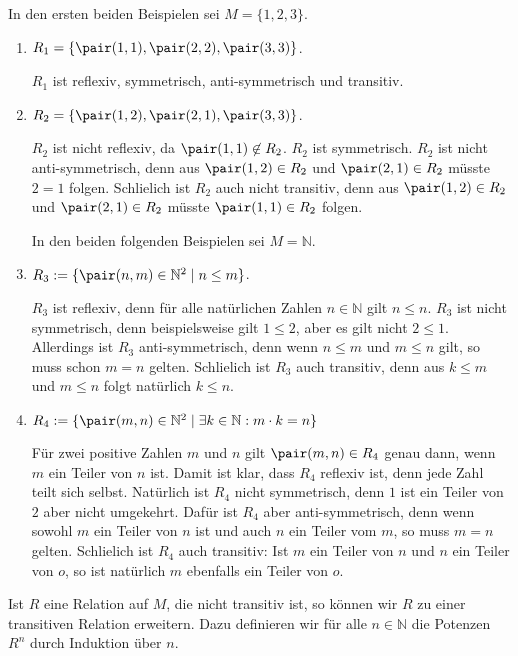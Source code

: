 \examples
In den ersten beiden Beispielen sei $M = \{1,2,3\}$.
\begin{enumerate}
\item $R_1 = \{ \pair(1,1), \pair(2,2), \pair(3,3) \}$.

      $R_1$ ist reflexiv, symmetrisch, anti-symmetrisch und transitiv.
\item $R_2 = \{ \pair(1,2), \pair(2,1), \pair(3,3) \}$.

      $R_2$ ist nicht reflexiv, da $\pair(1,1) \not\in R_2$.
      $R_2$ ist symmetrisch. 
      $R_2$ ist nicht anti-symmetrisch, denn aus $\pair(1,2) \in R_2$ und 
      $\pair(2,1) \in R_2$ m\"{u}sste $2=1$ folgen.
      Schlie\3lich ist $R_2$ auch nicht transitiv, denn aus $\pair(1,2) \in R_2$ und 
      $\pair(2,1) \in R_2$ m\"{u}sste $\pair(1,1) \in R_2$ folgen.

      In den beiden folgenden Beispielen sei $M = \mathbb{N}$.
\item $R_3 := \{ \pair(n,m) \in \mathbb{N}^2 \mid n \leq m \}$.

      $R_3$ ist reflexiv, denn f\"{u}r alle nat\"{u}rlichen Zahlen $n \in \mathbb{N}$ gilt 
      $n \leq n$.  $R_3$ ist nicht symmetrisch, denn beispielsweise gilt
      $1 \leq 2$, aber es gilt nicht $2 \leq 1$.  Allerdings ist $R_3$ anti-symmetrisch,
      denn wenn $n \leq m$  und $m \leq n$ gilt, so muss schon $m = n$ gelten.
      Schlie\3lich ist $R_3$ auch transitiv, denn aus $k \leq m$ und $m \leq n$ folgt
      nat\"{u}rlich $k \leq n$.
\item $R_4 := \{ \pair(m,n) \in \mathbb{N}^2 \mid \exists k\in \mathbb{N}: m\cdot k = n \}$

      F\"{u}r zwei positive Zahlen $m$ und $n$ gilt $\pair(m,n) \in R_4$ genau dann, wenn $m$ ein
      Teiler von $n$ ist.  Damit ist klar, dass $R_4$ reflexiv ist, denn jede Zahl
      teilt sich selbst.  Nat\"{u}rlich ist $R_4$ nicht symmetrisch, denn $1$ ist ein Teiler
      von $2$ aber nicht umgekehrt.  Daf\"{u}r ist $R_4$ aber anti-symmetrisch, denn wenn 
      sowohl $m$ ein Teiler von $n$ ist und auch $n$ ein Teiler vom $m$, so muss $m = n$
      gelten.  Schlie\3lich ist $R_4$ auch transitiv: Ist $m$ ein Teiler von $n$ und
      $n$ ein Teiler von $o$, so ist nat\"{u}rlich $m$ ebenfalls ein Teiler von $o$.
      \eox
\end{enumerate}
Ist $R$ eine Relation auf $M$, die nicht transitiv ist, so k\"{o}nnen wir $R$ zu einer
transitiven Relation erweitern.  Dazu definieren wir f\"{u}r alle $n \in \mathbb{N}$ die
Potenzen $R^n$ durch Induktion \"{u}ber $n$.

